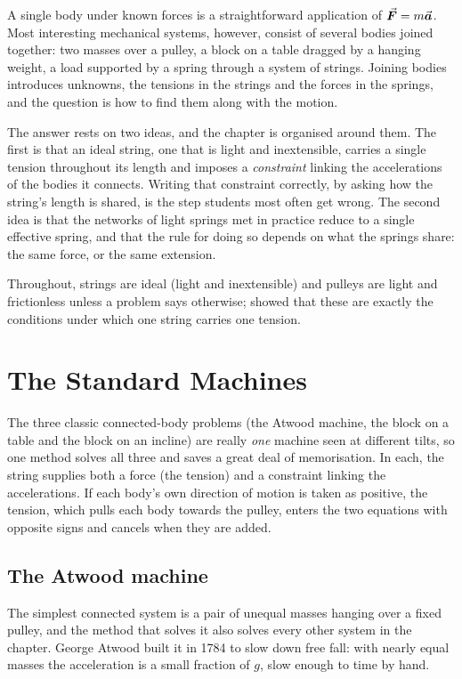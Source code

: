 
A single body under known forces is a straightforward application of $\vec{\bm{F}}=m\vec{\bm{a}}$. Most interesting
mechanical systems, however, consist of several bodies joined together: two masses over a pulley, a block
on a table dragged by a hanging weight, a load supported by a spring through a system of strings. Joining
bodies introduces unknowns, the tensions in the strings and the forces in the springs, and the question is
how to find them along with the motion.

The answer rests on two ideas, and the chapter is organised around them. The first is that an ideal string,
one that is light and inextensible, carries a single tension throughout its length and imposes a
\emph{constraint} linking the accelerations of the bodies it connects. Writing that constraint correctly,
by asking how the string's length is shared, is the step students most often get wrong. The second idea is that the networks of light springs met in practice
reduce to a single effective spring, and that the rule for doing so depends on what the springs share: the
same force, or the same extension.

Throughout, strings are ideal (light and inextensible) and pulleys are light and frictionless unless a
problem says otherwise;  showed that these are exactly the conditions under which one
string carries one tension.

\section{The Standard Machines}

The three classic connected-body problems (the Atwood machine, the block on a table and the block on an
incline) are really \emph{one} machine seen at different tilts, so one method solves all three and saves
a great deal of memorisation. In each, the string supplies both a force (the tension) and a constraint
linking the accelerations. If each body's own direction of motion is taken as positive, the tension,
which pulls each body towards the pulley, enters the two equations with opposite signs and cancels when
they are added.

\subsection{The Atwood machine}

The simplest connected system is a pair of unequal masses hanging over a fixed pulley, and the
method that solves it also solves every other system in the chapter. George Atwood built it in 1784 to slow down free
fall: with nearly equal masses the acceleration is a small fraction of $g$, slow enough to time by hand.

